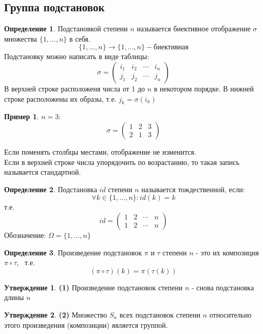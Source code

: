 \documentclass[a4paper, 12pt]{article}
\theoremstyle{definition}
\newtheorem*{definition}{Определение}
\newtheorem*{subtheorem}{Утверждение}
\newtheorem*{example1}{Пример}
\begin{document}
  \subsection{Группа подстановок}
  \begin{definition}
    Подстановкой степени $n$ называется биективное отображение $\sigma$ множества $\{1,...,n\}$ в себя. 
    $$\{1,...,n\} \to \{1,...,n\} - \text{биективная}$$  
    Подстановку можно написать в виде таблицы:
    $$\sigma = \begin{pmatrix}
      i_1 & i_2 & \cdots & i_n \\
      j_1 & j_2 & \cdots & j_n
    \end{pmatrix}$$ 
    В верхней строке расположеня числа от 1 до $n$ в некотором порядке. В нижней строке расположены их образы, т.е. $j_k = \sigma(i_k)$ 
    \begin{example1}
      $n=3:$ $$\sigma=\begin{pmatrix}
        1 & 2 & 3 \\
        2 & 1 & 3
      \end{pmatrix}$$  
    \end{example1}
    Если поменять столбцы местами, отображение не изменится. \\
    Если в верхней строке числа упорядочить по возрастанию, то такая запись называется стандартной.
  \end{definition} 
  \begin{definition}
    Подстановка $id$ степени $n$ называется тождественной, если:
    $$\forall k \in \{1,...,n\}: id(k) = k$$ 
    т.е. $$id = \begin{pmatrix}
      1 & 2 & \cdots & n \\
      1 & 2 & \cdots & n
    \end{pmatrix}$$  
    Обозначение: $\Omega = \{1,...,n\}$ 
  \end{definition} 
  \begin{definition}
    Произведение подстановок $\pi$ и $\tau$ степени $n$ - это их композиция $\pi \circ \tau$, \ т.е. $$(\pi \circ \tau)(k)= \pi(\tau(k))$$  
  \end{definition} 
  \begin{subtheorem}\textbf{(1)} 
    Произведение подстановок степени $n$ - снова подстановка длины $n$ 
  \end{subtheorem} 
  \begin{subtheorem}\textbf{(2)}
    Множество $S_n$ всех подстановок степени $n$ относительно этого произведения (композиции) является группой. 
  \end{subtheorem} 
\end{document}
